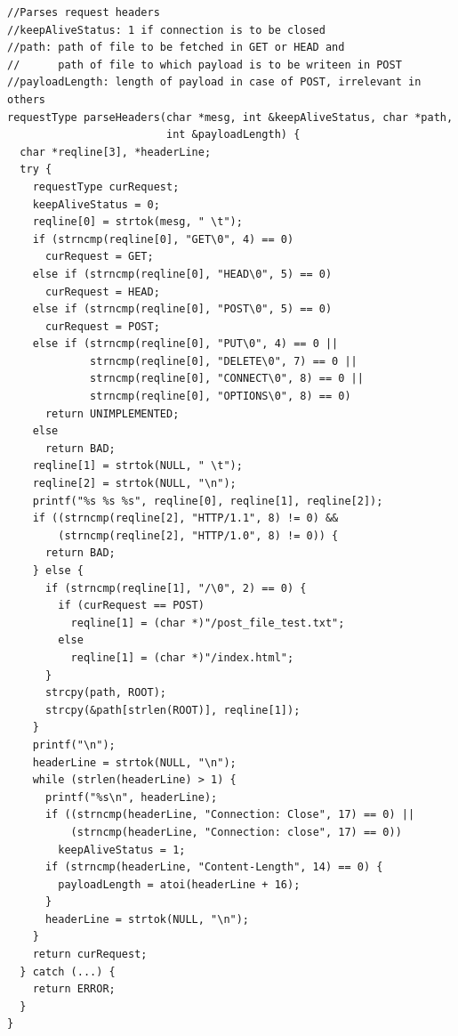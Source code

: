 \documentclass[11pt]{article}
\begin{document}
\begin{verbatim}
//Parses request headers
//keepAliveStatus: 1 if connection is to be closed
//path: path of file to be fetched in GET or HEAD and
//      path of file to which payload is to be writeen in POST
//payloadLength: length of payload in case of POST, irrelevant in others
requestType parseHeaders(char *mesg, int &keepAliveStatus, char *path,
                         int &payloadLength) {
  char *reqline[3], *headerLine;
  try {
    requestType curRequest;
    keepAliveStatus = 0;
    reqline[0] = strtok(mesg, " \t");
    if (strncmp(reqline[0], "GET\0", 4) == 0)
      curRequest = GET;
    else if (strncmp(reqline[0], "HEAD\0", 5) == 0)
      curRequest = HEAD;
    else if (strncmp(reqline[0], "POST\0", 5) == 0)
      curRequest = POST;
    else if (strncmp(reqline[0], "PUT\0", 4) == 0 ||
             strncmp(reqline[0], "DELETE\0", 7) == 0 ||
             strncmp(reqline[0], "CONNECT\0", 8) == 0 ||
             strncmp(reqline[0], "OPTIONS\0", 8) == 0)
      return UNIMPLEMENTED;
    else
      return BAD;
    reqline[1] = strtok(NULL, " \t");
    reqline[2] = strtok(NULL, "\n");
    printf("%s %s %s", reqline[0], reqline[1], reqline[2]);
    if ((strncmp(reqline[2], "HTTP/1.1", 8) != 0) &&
        (strncmp(reqline[2], "HTTP/1.0", 8) != 0)) {
      return BAD;
    } else {
      if (strncmp(reqline[1], "/\0", 2) == 0) {
        if (curRequest == POST)
          reqline[1] = (char *)"/post_file_test.txt";
        else
          reqline[1] = (char *)"/index.html";
      }
      strcpy(path, ROOT);
      strcpy(&path[strlen(ROOT)], reqline[1]);
    }
    printf("\n");
    headerLine = strtok(NULL, "\n");
    while (strlen(headerLine) > 1) {
      printf("%s\n", headerLine);
      if ((strncmp(headerLine, "Connection: Close", 17) == 0) ||
          (strncmp(headerLine, "Connection: close", 17) == 0))
        keepAliveStatus = 1;
      if (strncmp(headerLine, "Content-Length", 14) == 0) {
        payloadLength = atoi(headerLine + 16);
      }
      headerLine = strtok(NULL, "\n");
    }
    return curRequest;
  } catch (...) {
    return ERROR;
  }
}
\end{verbatim}
\end{document}
